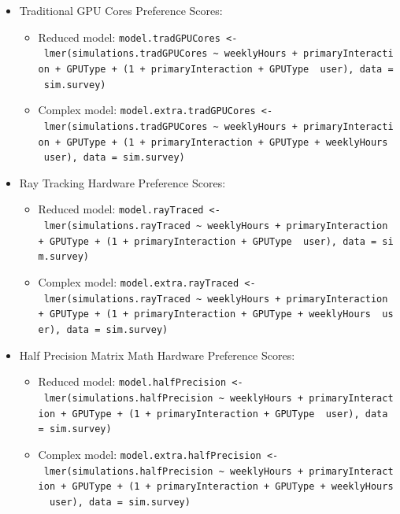 \documentclass[
]{article}
\providecommand{\tightlist}{%
  \setlength{\itemsep}{0pt}\setlength{\parskip}{0pt}}
\begin{document}
\begin{itemize}
\tightlist
\item
  Traditional GPU Cores Preference Scores:

  \begin{itemize}
  \tightlist
  \item
    Reduced model:
    \texttt{model.tradGPUCores\ \textless{}-\ lmer(simulations.tradGPUCores\ \textasciitilde{}\ weeklyHours\ +\ primaryInteraction\ +\ GPUType\ +\ (1\ +\ primaryInteraction\ +\ GPUType\ \textbar{}\ user),\ data\ =\ sim.survey)}
  \item
    Complex model:
    \texttt{model.extra.tradGPUCores\ \textless{}-\ lmer(simulations.tradGPUCores\ \textasciitilde{}\ weeklyHours\ +\ primaryInteraction\ +\ GPUType\ +\ (1\ +\ primaryInteraction\ +\ GPUType\ +\ weeklyHours\ \textbar{}\ user),\ data\ =\ sim.survey)}
  \end{itemize}
\item
  Ray Tracking Hardware Preference Scores:

  \begin{itemize}
  \tightlist
  \item
    Reduced model:
    \texttt{model.rayTraced\ \textless{}-\ lmer(simulations.rayTraced\ \textasciitilde{}\ weeklyHours\ +\ primaryInteraction\ +\ GPUType\ +\ (1\ +\ primaryInteraction\ +\ GPUType\ \textbar{}\ user),\ data\ =\ sim.survey)}
  \item
    Complex model:
    \texttt{model.extra.rayTraced\ \textless{}-\ lmer(simulations.rayTraced\ \textasciitilde{}\ weeklyHours\ +\ primaryInteraction\ +\ GPUType\ +\ (1\ +\ primaryInteraction\ +\ GPUType\ +\ weeklyHours\ \textbar{}\ user),\ data\ =\ sim.survey)}
  \end{itemize}
\item
  Half Precision Matrix Math Hardware Preference Scores:

  \begin{itemize}
  \tightlist
  \item
    Reduced model:
    \texttt{model.halfPrecision\ \textless{}-\ lmer(simulations.halfPrecision\ \textasciitilde{}\ weeklyHours\ +\ primaryInteraction\ +\ GPUType\ +\ (1\ +\ primaryInteraction\ +\ GPUType\ \textbar{}\ user),\ data\ =\ sim.survey)}
  \item
    Complex model:
    \texttt{model.extra.halfPrecision\ \textless{}-\ lmer(simulations.halfPrecision\ \textasciitilde{}\ weeklyHours\ +\ primaryInteraction\ +\ GPUType\ +\ (1\ +\ primaryInteraction\ +\ GPUType\ +\ weeklyHours\ \textbar{}\ user),\ data\ =\ sim.survey)}
  \end{itemize}
\end{itemize}
\end{document}
